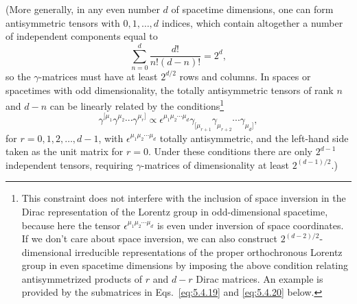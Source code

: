 (More generally, in any even number $d$ of spacetime dimensions, one can form
antisymmetric tensors with $0,1,\ldots,d$ indices, which contain altogether a
number of independent components equal to
\[
\sum_{n=0}^{d}\frac{d!}{n!(d-n)!}=2^d,
\]
so the $\gamma$-matrices must have at least $2^{d/2}$ rows and columns. In
spaces or spacetimes with odd dimensionality, the totally antisymmetric
tensors of rank $n$ and $d-n$ can be linearly related by the
conditions\footnote{This constraint does not interfere with the inclusion of
space inversion in the Dirac representation of the Lorentz group in
odd-dimensional spacetime, because here the tensor
$\epsilon^{\mu_1\mu_2\cdots\mu_d}$ is even under inversion of space
coordinates. If we don't care about space inversion, we can also construct
$2^{(d-2)/2}$-dimensional irreducible representations of the proper
orthochronous Lorentz group in even spacetime dimensions by imposing the above
condition relating antisymmetrized products of $r$ and $d-r$ Dirac matrices.
An example is provided by the submatrices in Eqs.~\eqref{eq:5.4.19} and \eqref{eq:5.4.20}
below.}
\[
\gamma^{[\mu_1}\gamma^{\mu_2}\cdots\gamma^{\mu_r]}
\propto\epsilon^{\mu_1\mu_2\cdots\mu_d}
\gamma_{[\mu_{r+1}}\gamma_{\mu_{r+2}}\cdots\gamma_{\mu_d]},
\]
for $r=0,1,2,\ldots,d-1$, with $\epsilon^{\mu_1\mu_2\cdots\mu_d}$ totally
antisymmetric, and the left-hand side taken as the unit matrix for $r=0$.
Under these conditions there are only $2^{d-1}$ independent tensors,
requiring $\gamma$-matrices of dimensionality at least $2^{(d-1)/2}$.)

